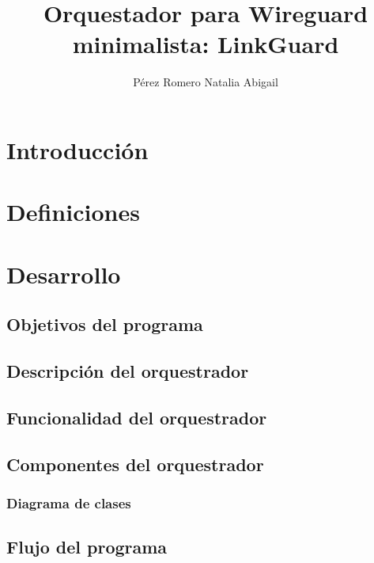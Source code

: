 \documentclass[letterpaper,12pt,oneside]{book}
\author{Pérez Romero Natalia Abigail}
\title{Orquestador para Wireguard minimalista: LinkGuard}
\begin{document}
\frontmatter
\maketitle


\mainmatter

\tableofcontents

\chapter{Introducción} %



\chapter{Definiciones}


\chapter{Desarrollo}

\section{Objetivos del programa}


\section{Descripción del orquestrador}


\section{Funcionalidad del orquestrador}



\section{Componentes del orquestrador}

\subsection{Diagrama de clases}


\section{Flujo del programa}


\end{document}
